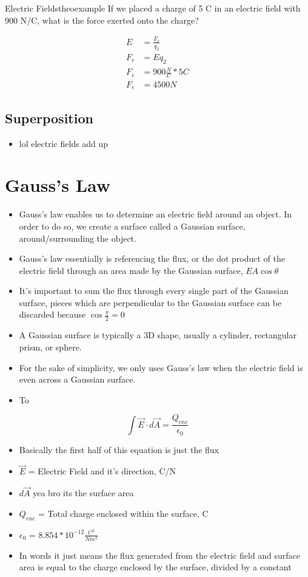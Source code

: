 \documentclass{article}
\begin{document}
\begin{mytheo}{Electric Fields}{theoexample}
	If we placed a charge of 5 C in an electric field with 900 N/C, what is the force exerted onto the charge? 
\end{mytheo}

\begin{align*}
	E &= \frac{F_{e}}{q_2}\\
	F_{e} &= E q_2\\
	F_{e} &= 900 \frac{N}{C} * 5C\\
	F_{e} &= 4500 N
\end{align*}
\subsection{Superposition}
\begin{itemize}
	\item lol electric fields add up
\end{itemize}
\section{Gauss's Law}
\begin{itemize}
	\item Gauss's law enables us to determine an electric field around an object. In order to do so, we create a surface called a Gaussian surface, around/surrounding the object.\\ 
	\item Gauss's law essentially is referencing the flux, or the dot product of the electric field through an area made by the Gaussian surface, $EA \cos\theta$
	\item It's important to sum the flux through every single part of the Gaussian surface,  pieces which are perpendicular to the Gaussian surface can be discarded because $\cos \frac{\pi}{2}=0$ 
	\item A Gaussian surface is typically a 3D shape, usually a cylinder, rectangular prism, or sphere. 
	\item For the sake of simplicity, we only uses Gauss's law when the electric field is even across a Gaussian surface. 
	\item To  
\end{itemize}
\[
	\int\vec{E}\cdot d\vec{A} = \frac{Q_{enc}}{\epsilon_0}
\]
\begin{itemize}
	\item Basically the first half of this equation is just the flux
	\item $\vec{E}$ = Electric Field and it's direction, C/N 
	\item $d\vec{A}$ yea bro its the surface area 
	\item $Q_{enc}$ = Total charge enclosed within the surface, C
	\item $\epsilon_{0}$ = $8.854*10^{-12}\frac{C^2}{Nm^2}$
	\item In words it just means the flux generated from the electric field and surface area is equal to the charge enclosed by the surface, divided by a constant
\end{itemize}
\end{document}
